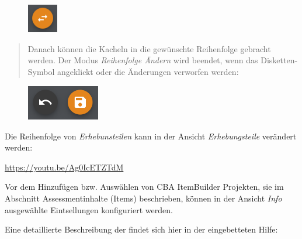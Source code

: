 \documentclass[
  letterpaper,
  DIV=11]{scrreprt}
\begin{document}
\begin{tcolorbox}
\begin{figure}[H]

\includegraphics[width=0.52083in,height=\textheight]{img/icon-toggle.png} \hfill{}

\end{figure}

\begin{quote}
Danach können die Kacheln in die gewünschte Reihenfolge gebracht werden.
Der Modus \emph{Reihenfolge Ändern} wird beendet, wenn das
Disketten-Symbol angeklickt oder die Änderungen verworfen werden:
\end{quote}

\begin{figure}[H]

\includegraphics[width=1.25in,height=\textheight]{img/screenshot-icons-undo-and-save-01.png} \hfill{}

\end{figure}

\end{tcolorbox}

Die Reihenfolge von \emph{Erhebunsteilen} kann in der Ansicht
\emph{Erhebungsteile} verändert werden:

\url{https://youtu.be/Ag0IcETZTdM}

Vor dem Hinzufügen bzw. Auswählen von CBA ItemBuilder Projekten, sie im
Abschnitt Assessmentinhalte (Items) beschrieben, können in der Ansicht
\emph{Info} ausgewählte Eintsellungen konfiguriert werden.

Eine detaillierte Beschreibung der findet sich hier in der eingebetteten
Hilfe:
\end{document}
